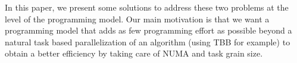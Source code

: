 In this paper, we present some solutions to address these two problems at the
level of the programming model.
Our main motivation is that we want a programming model that adds as few
programming effort as possible beyond a natural task based parallelization of
an algorithm (using TBB for example) to obtain a better efficiency by taking
care of NUMA and task grain size.


